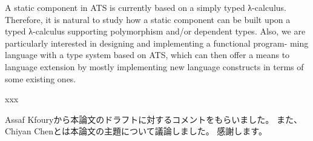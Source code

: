 \documentclass[submit,techreq,noauthor,onecolumn]{ipsj}
\begin{document}
A static component in ATS is currently based on a simply typed λ-calculus.
Therefore, it is natural to study how a static component can be built upon a
typed λ-calculus supporting polymorphism and/or dependent types.
Also, we are particularly interested in designing and implementing a functional program-
ming language with a type system based on ATS, which can then offer a means
to language extension by mostly implementing new language constructs in terms
of some existing ones.

xxx

\begin{acknowledgment}
Assaf Kfouryから本論文のドラフトに対するコメントをもらいました。
また、Chiyan Chenとは本論文の主題について議論しました。
感謝します。
\end{acknowledgment}

\end{document}
